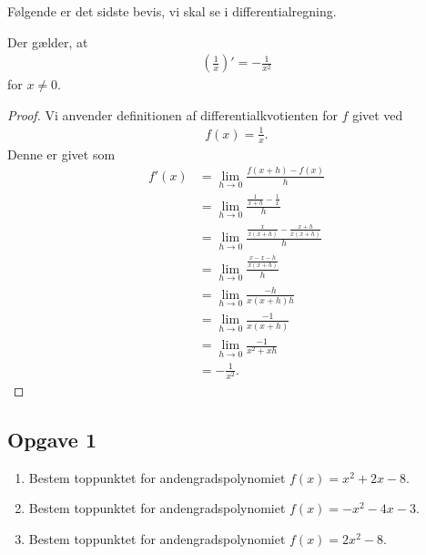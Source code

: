 Følgende er det sidste bevis, vi skal se i differentialregning.
\begin{setn}
	Der gælder, at 
	\begin{align*}
		\left(\frac{1}{x}\right)' = -\frac{1}{x^2}
	\end{align*}
	for $x\neq 0$. 
\end{setn}
\begin{proof}
	Vi anvender definitionen af differentialkvotienten for $f$ givet ved
	\begin{align*}
		f(x) = \frac{1}{x}.
	\end{align*}
	Denne er givet som
	\begin{align*}
		f'(x) &= \lim_{h \to 0} \frac{f(x+h)-f(x)}{h} \\
		&= \lim_{h \to 0} \frac{\frac{1}{x+h} - \frac{1}{x}}{h} \\
		&= \lim_{h \to 0} \frac{\frac{x}{x(x+h)}-\frac{x+h}{x(x+h)}}{h} \\
		&= \lim_{h \to 0} \frac{\frac{x-x-h}{x(x+h)}}{h} \\
		&= \lim_{h \to 0} \frac{-h}{x(x+h)h} \\
		&= \lim_{h \to 0} \frac{-1}{x(x+h)} \\
		&= \lim_{h \to 0} \frac{-1}{x^2+xh} \\
		&= -\frac{1}{x^2}.
	\end{align*}
\end{proof}


\subsection*{Opgave 1}

\begin{enumerate}[label=\roman*)]
	\item Bestem toppunktet for andengradspolynomiet $f(x) = x^2+2x-8$.
	\item Bestem toppunktet for andengradspolynomiet $f(x) = -x^2-4x - 3$.
	\item Bestem toppunktet for andengradspolynomiet $f(x) = 2x^2-8$.
\end{enumerate}